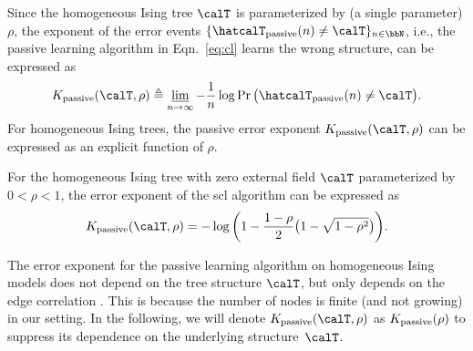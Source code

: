 \documentclass[11pt,onecolumn]{article}
\newcommand{\Passive}{{\rm passive}}
\begin{document}
Since the homogeneous Ising tree $\calT$ is parameterized by (a single parameter) $\rho$, the exponent of the error events $\{\hatcalT_{\Passive}(n)\neq \calT\}_{n\in \bbN}$, i.e., the passive learning algorithm in Eqn.~\eqref{eq:cl} learns the wrong structure, can be expressed as
\begin{align}\label{eq:passiveee}
	K _{\Passive}(\calT,\rho)\triangleq \varliminf_{n\rightarrow \infty}-\frac{1}{n}\log \Pr \big(\hatcalT_{\Passive}(n)\neq \calT\big).
\end{align}
For homogeneous Ising trees, the passive error exponent $K _{\Passive}(\calT,\rho)$ can be expressed as an  explicit  function of $\rho$.
\begin{proposition}
	For the homogeneous Ising tree with zero external field $\calT$ parameterized by $0<\rho<1$, the error exponent of the \ac{scl} algorithm can be expressed as
	\begin{align}
		K _{\Passive}(\calT,\rho)=-\log\bigg(1-\frac{1-\rho}{2}\big(1-\sqrt{1-\rho^{2}}\big)\bigg).
	\end{align} 
\end{proposition}
\begin{remark}
	The error exponent for the passive learning algorithm on homogeneous Ising models does not depend on the tree structure $\calT$, but only depends on the edge 
	correlation \cite{tandon2020exact}. This is because the number of nodes is finite (and not growing) in our setting. In the following, we will denote $K _{\Passive}(\calT,\rho)$ as $K _{\Passive}(\rho)$ to suppress its dependence on the underlying structure~$\calT$.
\end{remark}
\end{document}
